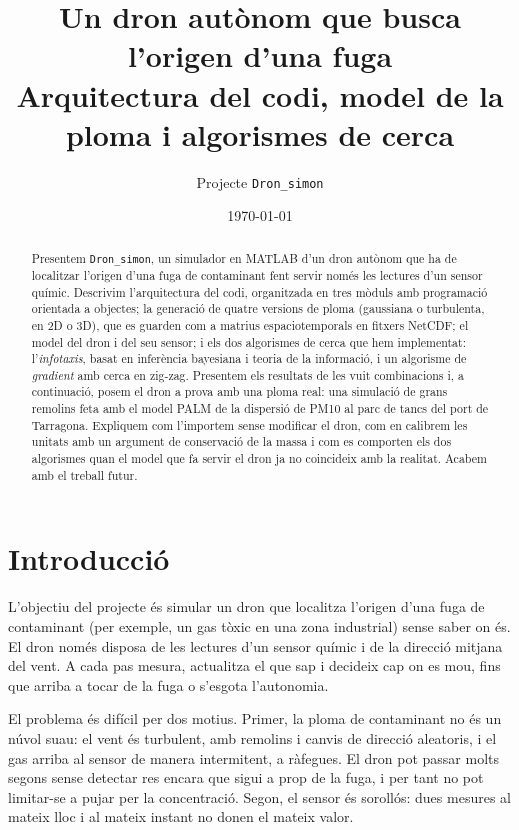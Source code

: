 \documentclass[11pt,a4paper]{article}
\title{\textbf{Un dron autònom que busca l'origen d'una fuga}\\[4pt]\large Arquitectura del codi, model de la ploma i algorismes de cerca}
\author{Projecte \texttt{Dron\_simon}}
\date{\today}
\begin{document}
\maketitle

\begin{abstract}
Presentem \texttt{Dron\_simon}, un simulador en MATLAB d'un dron autònom que ha de localitzar l'origen d'una fuga de contaminant fent servir només les lectures d'un sensor químic. Descrivim l'arquitectura del codi, organitzada en tres mòduls amb programació orientada a objectes; la generació de quatre versions de ploma (gaussiana o turbulenta, en 2D o 3D), que es guarden com a matrius espaciotemporals en fitxers NetCDF; el model del dron i del seu sensor; i els dos algorismes de cerca que hem implementat: l'\emph{infotaxis}, basat en inferència bayesiana i teoria de la informació, i un algorisme de \emph{gradient} amb cerca en zig-zag. Presentem els resultats de les vuit combinacions i, a continuació, posem el dron a prova amb una ploma real: una simulació de grans remolins feta amb el model PALM de la dispersió de PM10 al parc de tancs del port de Tarragona. Expliquem com l'importem sense modificar el dron, com en calibrem les unitats amb un argument de conservació de la massa i com es comporten els dos algorismes quan el model que fa servir el dron ja no coincideix amb la realitat. Acabem amb el treball futur.
\end{abstract}

\setcounter{tocdepth}{1}
\tableofcontents

\section{Introducció}

L'objectiu del projecte és simular un dron que localitza l'origen d'una fuga de contaminant (per exemple, un gas tòxic en una zona industrial) sense saber on és. El dron només disposa de les lectures d'un sensor químic i de la direcció mitjana del vent. A cada pas mesura, actualitza el que sap i decideix cap on es mou, fins que arriba a tocar de la fuga o s'esgota l'autonomia.

El problema és difícil per dos motius. Primer, la ploma de contaminant no és un núvol suau: el vent és turbulent, amb remolins i canvis de direcció aleatoris, i el gas arriba al sensor de manera intermitent, a ràfegues. El dron pot passar molts segons sense detectar res encara que sigui a prop de la fuga, i per tant no pot limitar-se a pujar per la concentració. Segon, el sensor és sorollós: dues mesures al mateix lloc i al mateix instant no donen el mateix valor.
\end{document}
